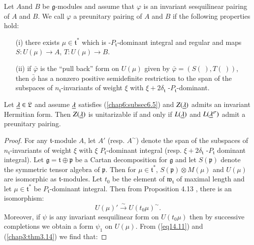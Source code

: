 \setcounter{prop}{8}
\begin{definition}\label{chap14:def14.9}
Let $A$\pageoriginale and $B$ be $\mathfrak{g}$-modules and assume
that $\varphi$ is an invariant sesquilinear pairing of $A$ and $B$. We
call $\varphi$ a preunitary pairing of $A$ and $B$ if the following
properties hold:
\begin{itemize}
\item[{\rm (i)}] there exists $\mu \in \mathfrak{t}^*$ which is
  -$P_\mathfrak{t}$-dominant integral and regular and maps $S: U(\mu)
  \to A$, $T : U(\mu) \to B$. 

\item[{\rm (ii)}] if $\bar{\varphi}$ is the ``pull back'' form on
  $U(\mu)$ given by $\bar{\varphi} = (S(~), T(~))$, then $\bar{\phi}$
  has a nonzero positive semidefinite restriction to the span of the
  subspaces of $n_\mathfrak{t}$-invariants of weight $\xi$ with
  $\xi+2\delta_\mathfrak{t}$ -$P_\mathfrak{t}$-dominant. 
\end{itemize}
\end{definition}

\begin{prop}\label{chap14:prop14.10}
Let $\underline{\lambda} \in \mathfrak{L}$ and assume $\underline{\lambda}$ satisfies
(\ref{chap6:subsec6.5}) and $Z(\underline{\lambda})$ admits an invariant Hermitian form. Then
$Z(\underline{\lambda})$ is unitarizable if and only if $L(\underline{\lambda})$ and
$L(\underline{\lambda}^{\sigma})$ admit a preunitary pairing. 
\end{prop}

\begin{proof}
For any $\mathfrak{t}$-module $A$, let $A'$ (resp. $A^\sim$) denote
the span of the subspaces of $n_\mathfrak{t}$-invariants of weight
$\xi$ with $\xi $ $P_\mathfrak{t}$-dominant integral (resp. $\xi + 2
\delta_\mathfrak{t}$ -$P_\mathfrak{t}$ dominant integral). Let
$\mathfrak{g} = \mathfrak{t} \oplus \mathfrak{p}$  be a Cartan
decomposition for $\mathfrak{g}$ and let $S(\mathfrak{p})$ denote the
symmetric tensor algebra of $\mathfrak{p}$. Then for $\mu \in
\mathfrak{t}^*$, $S(\mathfrak{p}) \otimes M(\mu)$ and $U(\mu)$ are
isomorphic as $\mathfrak{t}$-modules. Let $t_0$ be the element of
$\mathfrak{w}_\mathfrak{t}$ of maximal length and let $\mu \in
\mathfrak{t}^*$ be $P_\mathfrak{t}$-dominant integral. Then from
Proposition 4.13 \cite{key15}, there is an isomorphism:
\begin{equation*}
U(\mu)' \xrightarrow{\sim} U(t_0 \mu)^\sim. \tag{14.11}\label{eq14.11}
\end{equation*}
Moreover, if $\psi$ is any invariant sesquilinear form on $U(t_0 \mu)$
then by successive completions we obtain a form $\psi_1$ on
$U(\mu)$. From (\ref{eq14.11}) and (\ref{chap3:thm3.14}) we find that: 
\end{proof}


